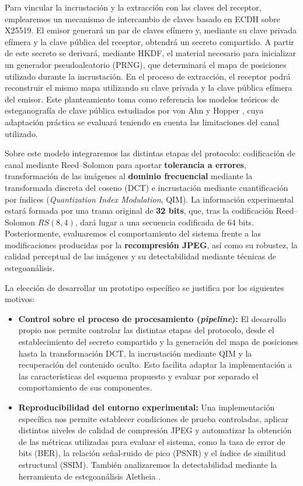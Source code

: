 \documentclass[IB]{TFUOC}%
\begin{document}
Para vincular la incrustación y la extracción con las claves del receptor, emplearemos un mecanismo de intercambio de claves basado en ECDH sobre X25519. El emisor generará un par de claves efímero y, mediante su clave privada efímera y la clave pública del receptor, obtendrá un secreto compartido. A partir de este secreto se derivará, mediante HKDF, el material necesario para inicializar un generador pseudoaleatorio (PRNG), que determinará el mapa de posiciones utilizado durante la incrustación. En el proceso de extracción, el receptor podrá reconstruir el mismo mapa utilizando su clave privada y la clave pública efímera del emisor. Este planteamiento toma como referencia los modelos teóricos de esteganografía de clave pública estudiados por von Ahn y Hopper \cite{4}, cuya adaptación práctica se evaluará teniendo en cuenta las limitaciones del canal utilizado.

Sobre este modelo integraremos las distintas etapas del protocolo: codificación de canal mediante Reed--Solomon para aportar \textbf{tolerancia a errores}, transformación de las imágenes al \textbf{dominio frecuencial} mediante la transformada discreta del coseno (DCT) e incrustación mediante cuantificación por índices (\textit{Quantization Index Modulation}, QIM). La información experimental estará formada por una trama original de \textbf{32 bits}, que, tras la codificación Reed--Solomon $RS(8,4)$, dará lugar a una secuencia codificada de 64 bits. Posteriormente, evaluaremos el comportamiento del sistema frente a las modificaciones producidas por la \textbf{recompresión JPEG}, así como su robustez, la calidad perceptual de las imágenes y su detectabilidad mediante técnicas de estegoanálisis.

La elección de desarrollar un prototipo específico se justifica por los siguientes motivos:

\begin{itemize}
    \item \textbf{Control sobre el proceso de procesamiento (\textit{pipeline}):} El desarrollo propio nos permite controlar las distintas etapas del protocolo, desde el establecimiento del secreto compartido y la generación del mapa de posiciones hasta la transformación DCT, la incrustación mediante QIM y la recuperación del contenido oculto. Esto facilita adaptar la implementación a las características del esquema propuesto y evaluar por separado el comportamiento de sus componentes.
    \item \textbf{Reproducibilidad del entorno experimental:} Una implementación específica nos permite establecer condiciones de prueba controladas, aplicar distintos niveles de calidad de compresión JPEG y automatizar la obtención de las métricas utilizadas para evaluar el sistema, como la tasa de error de bits ($\mathrm{BER}$), la relación señal-ruido de pico ($\mathrm{PSNR}$) y el índice de similitud estructural ($\mathrm{SSIM}$). También analizaremos la detectabilidad mediante la herramienta de estegoanálisis Aletheia \cite{1}.
\end{itemize}
\end{document}
